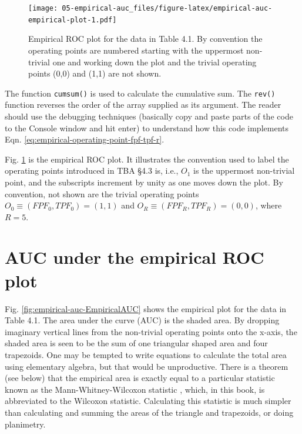 \documentclass[
]{book}
\begin{document}
\begin{figure}
\centering
\texttt{[image: 05-empirical-auc\_files/figure-latex/empirical-auc-empirical-plot-1.pdf]}
\caption{\label{fig:empirical-auc-empirical-plot}Empirical ROC plot for the data in Table 4.1. By convention the operating points are numbered starting with the uppermost non-trivial one and working down the plot and the trivial operating points (0,0) and (1,1) are not shown.}
\end{figure}

The function \texttt{cumsum()} is used to calculate the cumulative sum. The \texttt{rev()} function reverses the order of the array supplied as its argument. The reader should use the debugging techniques (basically copy and paste parts of the code to the Console window and hit enter) to understand how this code implements Eqn. \eqref{eq:empirical-operating-point-fpf-tpf-r}.

Fig. \ref{fig:empirical-auc-empirical-plot} is the empirical ROC plot. It illustrates the convention used to label the operating points introduced in TBA §4.3 is, i.e., \(O_1\) is the uppermost non-trivial point, and the subscripts increment by unity as one moves down the plot. By convention, not shown are the trivial operating points \(O_0 \equiv (FPF_0, TPF_0) = (1,1)\) and \(O_R \equiv (FPF_R, TPF_R) = (0,0)\), where \(R = 5\).

\hypertarget{empirical-auc-area-under}{%
\section{AUC under the empirical ROC plot}\label{empirical-auc-area-under}}

Fig. \ref{fig:empirical-auc-EmpiricalAUC} shows the empirical plot for the data in Table 4.1. The area under the curve (AUC) is the shaded area. By dropping imaginary vertical lines from the non-trivial operating points onto the x-axis, the shaded area is seen to be the sum of one triangular shaped area and four trapezoids. One may be tempted to write equations to calculate the total area using elementary algebra, but that would be unproductive. There is a theorem (see below) that the empirical area is exactly equal to a particular statistic known as the Mann-Whitney-Wilcoxon statistic \citep{RN2191, RN2197}, which, in this book, is abbreviated to the Wilcoxon statistic. Calculating this statistic is much simpler than calculating and summing the areas of the triangle and trapezoids, or doing planimetry.
\end{document}
